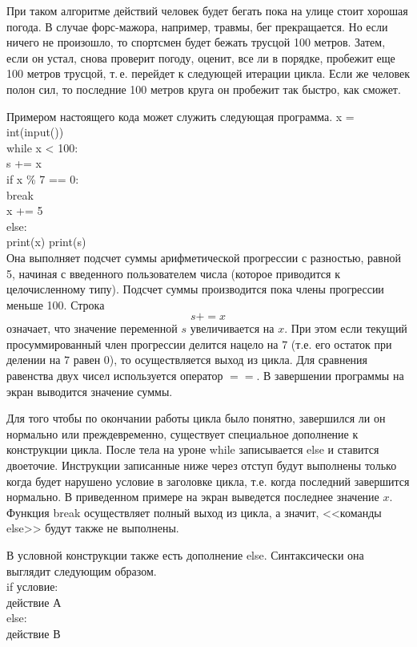 \documentclass[a4paper, fleqn]{article}
\begin{document}
	При таком алгоритме действий человек будет бегать пока на улице стоит хорошая погода. В случае форс-мажора, например, травмы, бег прекращается. Но если ничего не произошло, то спортсмен будет бежать трусцой 100 метров. Затем, если он устал, снова проверит погоду, оценит, все ли в порядке, пробежит еще 100 метров трусцой, т.\,е. перейдет к следующей итерации цикла. Если же человек полон сил, то последние 100 метров круга он пробежит так быстро, как сможет.
	
	Примером настоящего кода может служить следующая программа.
	x = int(input())\\
	while x < 100:\\
	\qquad s += x\\
	\qquad if x \% 7 == 0:\\
	\qquad \qquad break\\
	\qquad x += 5\\
	else:\\
	\qquad print(x)
	print(s)\\
	Она выполняет подсчет суммы арифметической прогрессии с разностью, равной 5,  начиная с введенного пользователем числа (которое приводится к целочисленному типу). Подсчет суммы производится пока члены прогрессии меньше 100. Строка 
	\[s += x\] 
	означает, что значение переменной $s$  увеличивается на $x$. При этом если текущий просуммированный член прогрессии делится нацело на $7$ (т.е. его остаток при делении на $7$ равен $0$), то осуществляется выход из цикла. Для сравнения равенства двух чисел используется оператор $==$.
	В завершении программы на экран выводится значение суммы.
	
	Для того чтобы по окончании работы цикла было понятно, завершился ли он нормально или преждевременно, существует специальное дополнение к конструкции цикла. После тела на уроне while записывается else и ставится двоеточие. Инструкции записанные ниже через отступ будут выполнены только когда будет нарушено условие в заголовке цикла, т.е. когда последний завершится нормально. В приведенном примере на экран выведется последнее значение $x$. Функция break осуществляет полный выход из цикла, а значит, <<команды else>> будут также не выполнены.
	
	
	В условной конструкции также есть дополнение else. Синтаксически она выглядит следующим образом.\\
	if условие:\\
	\qquad действие А\\
	else: \\
	\qquad действие В\\
	
\end{document}
